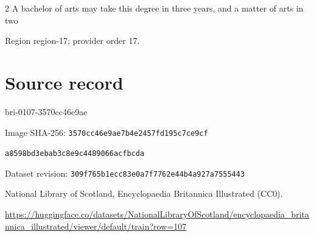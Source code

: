 \documentclass[11pt]{article}
\begin{document}
2 A bachelor of arts may take this degree in three years, and a matter of arts in two
\par

{\scriptsize\color{gray} Region region-17; provider order 17.\par}
\medskip
\newpage\section*{Source record}
bri-0107-3570cc46e9ae\par
Image SHA-256: \texttt{3570cc46e9ae7b4e2457fd195c7ce9cf}\par\texttt{a8598bd3ebab3c8e9c4489066acfbcda}\par
Dataset revision: \texttt{309f765b1ecc83e0a7f7}\texttt{762e44b4a927a7555443}\par
National Library of Scotland, Encyclopaedia Britannica Illustrated (CC0).\par
\url{https://huggingface.co/datasets/NationalLibraryOfScotland/encyclopaedia_britannica_illustrated/viewer/default/train?row=107}
\end{document}
